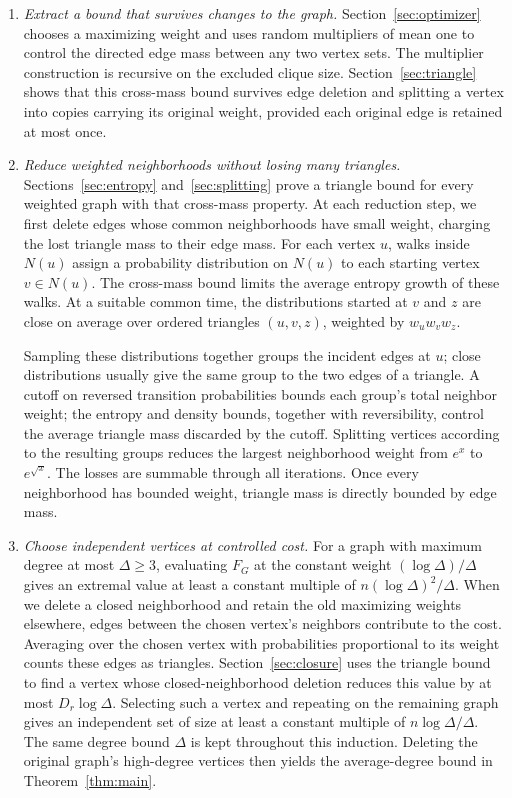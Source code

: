 \documentclass[11pt]{article}
\theoremstyle{definition}
\theoremstyle{remark}
\numberwithin{equation}{section}
\begin{document}
\begin{enumerate}
\item \emph{Extract a bound that survives changes to the graph.}
Section~\ref{sec:optimizer} chooses a maximizing weight and uses random
multipliers of mean one to control the directed edge mass between any
two vertex sets. The multiplier construction is recursive on the excluded
clique size. Section~\ref{sec:triangle} shows that this cross-mass
bound survives edge deletion and splitting a vertex into copies carrying
its original weight, provided each original edge is retained at most once.

\item \emph{Reduce weighted neighborhoods without losing many triangles.}
Sections~\ref{sec:entropy} and~\ref{sec:splitting} prove a triangle bound
for every weighted graph with that cross-mass property. At each reduction
step, we first delete edges whose common neighborhoods have small weight,
charging the lost triangle mass to their edge mass. For each vertex
$u$, walks inside $N(u)$ assign a probability distribution on $N(u)$ to
each starting vertex $v\in N(u)$. The cross-mass bound limits the average
entropy growth of these walks. At a suitable common time, the distributions
started at $v$ and $z$ are close on average over ordered triangles $(u,v,z)$,
weighted by $w_uw_vw_z$.

Sampling these distributions together groups the incident edges at $u$;
close distributions usually give the same group to the two edges of a
triangle. A cutoff on reversed transition probabilities bounds each
group's total neighbor weight; the entropy and density bounds, together
with reversibility, control the average triangle mass discarded by the
cutoff. Splitting vertices according to
the resulting groups reduces the largest neighborhood weight from
$e^x$ to $e^{\sqrt{x}}$. The losses are summable through all iterations.
Once every neighborhood has bounded weight, triangle mass is directly
bounded by edge mass.

\item \emph{Choose independent vertices at controlled cost.}
For a graph with maximum degree at most $\Delta\ge3$, evaluating $F_G$ at
the constant weight $(\log\Delta)/\Delta$ gives an extremal value at
least a constant multiple of $n(\log\Delta)^2/\Delta$.
When we delete a closed neighborhood and retain the old maximizing weights
elsewhere, edges between the chosen vertex's neighbors contribute to
the cost. Averaging over the chosen vertex with probabilities proportional
to its weight counts these edges as triangles.
Section~\ref{sec:closure} uses the triangle bound to find a vertex whose
closed-neighborhood deletion reduces this value by at most
$D_r\log\Delta$. Selecting such a vertex and repeating on the remaining
graph gives an independent set of size at least a constant multiple of
$n\log\Delta/\Delta$. The same degree bound $\Delta$ is kept throughout
this induction. Deleting the original graph's high-degree vertices then
yields the average-degree bound in Theorem~\ref{thm:main}.
\end{enumerate}
\end{document}
